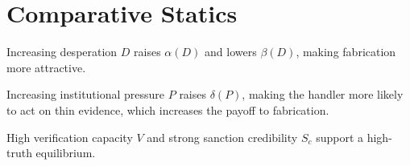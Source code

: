 \section{Comparative Statics}

Increasing desperation $D$ raises $\alpha(D)$ and lowers $\beta(D)$,
making fabrication more attractive.

Increasing institutional pressure $P$ raises $\delta(P)$, making the
handler more likely to act on thin evidence, which increases the payoff
to fabrication.

High verification capacity $V$ and strong sanction credibility $S_c$
support a high-truth equilibrium.
